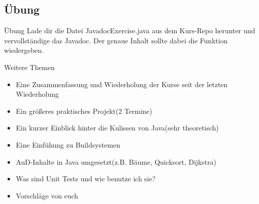 \subsection{Übung}
\begin{frame}{Übung}
    \center
    \large
    Lade dir die Datei JavadocExercise.java aus dem Kurs-Repo herunter und vervollständige das Javadoc.
    Der genaue Inhalt sollte dabei die Funktion wiedergeben.
\end{frame}

\begin{frame}{Weitere Themen}
    \begin{itemize}[<+->]
        \item Eine Zusammenfassung und Wiederholung der Kurse seit der letzten Wiederholung
        \item Ein größeres praktisches Projekt(2 Termine)
        \item Ein kurzer Einblick hinter die Kulissen von Java(sehr theoretisch)
        \item Eine Einfühung zu Buildsystemen
        \item AuD-Inhalte in Java umgesetzt(z.B. Bäume, Quicksort, Dijkstra)
        \item Was sind Unit Tests und wie benutze ich sie?
        \item Vorschläge von euch
    \end{itemize}
\end{frame}

